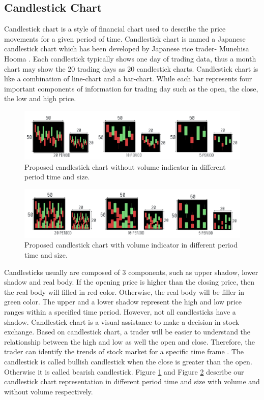 \documentclass[12pt]{article}
\begin{document}
\subsection{Candlestick Chart}
Candlestick chart is a style of financial chart used to describe the price movements for a given period of time. Candlestick chart is named a Japanese candlestick chart which has been developed by Japanese rice trader- Munehisa Hooma \cite{morris2006candlestick}. Each candlestick typically shows one day of trading data, thus a month chart may show the 20 trading days as 20 candlestick charts. Candlestick chart is like a combination of line-chart and a bar-chart. While each bar represents four important components of information for trading day such as the open, the close, the low and high price.
\begin{figure}
\centering
  \includegraphics[width=0.8\columnwidth]{figures/candlewithoutvolume.png}
  \caption{Proposed candlestick chart without volume indicator in different period time and size.}
  \label{fig:candlewithoutvolume}
\end{figure}
\begin{figure}
\centering
  \includegraphics[width=0.8\columnwidth]{figures/candlewithvolume.png}
  \caption{Proposed candlestick chart with volume indicator in different period time and size.}
  \label{fig:candlewithvolume}
\end{figure}
Candlesticks usually are composed of 3 components, such as upper shadow, lower shadow and real body. If the opening price is higher than the closing price, then the real body will filled in red color. Otherwise, the real body will be filler in green color. The upper and a lower shadow represent the high and low price ranges within a specified time period. However, not all candlesticks have a shadow. Candlestick chart is a visual assistance to make a decision in stock exchange. Based on candlestick chart, a trader will be easier to understand the relationship between the high and low as well the open and close. Therefore, the trader can identify the trends of stock market for a specific time frame \cite{lu2012profitable}. The candlestick is called bullish candlestick when the close is greater than the open. Otherwise it is called bearish candlestick.
Figure \ref{fig:candlewithoutvolume} and Figure \ref{fig:candlewithvolume} describe our candlestick chart representation in different period time and size with volume and without volume respectively.
\end{document}
